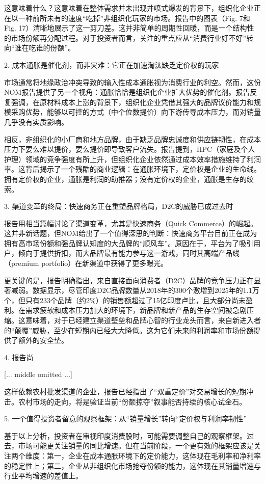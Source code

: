 \documentclass[11pt]{ctexart}
\begin{document}
这意味着什么？这意味着在整体需求并未出现井喷式爆发的背景下，组织化企业正在以一种前所未有的速度“吃掉”非组织化玩家的市场。报告中的图表（Fig. 7和Fig. 17）清晰地展示了这一剪刀差。这并非简单的周期性回暖，而是一个结构性的市场份额再分配过程。对于投资者而言，关注的重点应从“消费行业好不好”转向“谁在吃谁的份额”。

2. 成本通胀是催化剂，而非灾难：它正在加速淘汰缺乏定价权的玩家

市场通常将地缘政治冲突导致的输入性成本通胀视为消费行业的利空。然而，这份NOM报告提供了另一个视角：通胀恰恰是组织化企业扩大优势的催化剂。报告反复强调，在原材料成本上涨的背景下，组织化企业凭借其强大的品牌议价能力和规模采购优势，能够以可控的方式（中个位数提价）向下游传导成本压力，而对销量几乎没有实质影响。

相反，非组织化的小厂商和地方品牌，由于缺乏品牌忠诚度和供应链韧性，在成本压力下要么难以提价，要么提价即导致客户流失。报告提到，HPC（家庭及个人护理）领域的竞争强度有所上升，但组织化企业依然通过成本效率措施维持了利润率。这背后揭示了一个残酷的商业逻辑：在通胀环境下，定价权是企业的生命线。拥有定价权的企业，通胀是利润的助推器；没有定价权的企业，通胀是生存的绞索。

3. 渠道变革的终局：快速商务正在重塑品牌格局，D2C的威胁已成过去时

报告用相当篇幅讨论了渠道变革，尤其是快速商务（Quick Commerce）的崛起。这并非新话题，但NOM给出了一个值得深思的判断：快速商务平台目前正在成为拥有高市场份额和强品牌认知度的大品牌的“顺风车”。原因在于，平台为了吸引用户，倾向于提供折扣，而大品牌最有能力参与这一游戏，同时其高端产品线（premium portfolio）在新渠道中获得了更多曝光。

更关键的是，报告明确指出，来自直接面向消费者（D2C）品牌的竞争压力正在显著减弱。数据显示，尽管印度D2C品牌数量从2018年的300个激增到2025年的1.1万个，但只有233个品牌（约2\%）的销售额超过了15亿印度卢比，且大部分尚未盈利。在需求疲软和成本压力加大的环境下，新品牌和新产品的生存空间被急剧压缩。这意味着，对于已经建立渠道壁垒和品牌心智的行业龙头而言，来自新进入者的“颠覆”威胁，至少在短期内已经大大降低。这为它们未来的利润率和市场份额提供了额外的安全垫。

4. 报告尚

[... middle omitted ...]

这样依赖农村批发渠道的企业，报告已经指出了“双重定价”对交易增长的短期冲击。农村市场的走向，将是验证当前“份额掠夺”叙事能否持续的核心试金石。

5. 一个值得投资者留意的观察框架：从“销量增长”转向“定价权与利润率韧性”

基于以上分析，投资者在审视印度消费股时，可能需要调整自己的观察框架。过去，市场可能更关注销量的同比增速。但在当前阶段，一个更有效的框架应该是关注两个维度：第一，企业在成本通胀环境下的定价能力，这体现在毛利率和净利率的稳定性上；第二，企业从非组织化市场抢夺份额的能力，这体现在其销量增速与行业平均增速的差值上。
\end{document}
